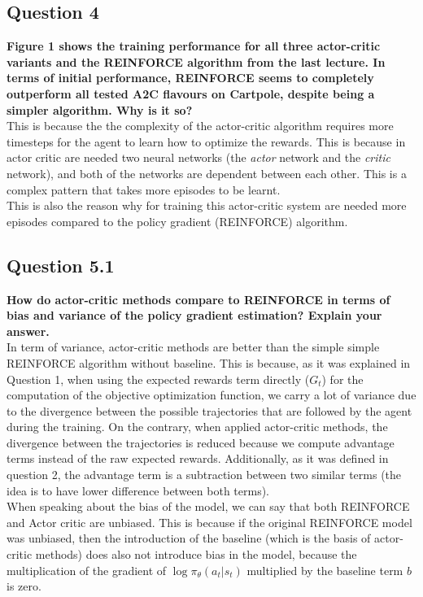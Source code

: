 \documentclass[12pt]{article}
\begin{document}
\subsection{Question 4}
\textbf{Figure 1 shows the training performance for all three actor-critic variants and the REINFORCE algorithm from the last lecture. In terms of initial performance, REINFORCE seems to completely outperform all tested A2C flavours on Cartpole, despite being a simpler algorithm. Why is it so? }\\

This is because the the complexity of the actor-critic algorithm requires more timesteps for the agent to learn how to optimize the rewards. This is because in actor critic are needed two neural networks (the \textit{actor} network and the \textit{critic} network), and both of the networks are dependent between each other. This is a complex pattern that takes more episodes to be learnt.\\

This is also the reason why for training this actor-critic system are needed more episodes compared to the policy gradient (REINFORCE) algorithm.

\subsection{Question 5.1}
\textbf{How do actor-critic methods compare to REINFORCE in terms of bias and variance of the policy gradient estimation? Explain your answer.}\\

In term of variance, actor-critic methods are better than the simple simple REINFORCE algorithm without baseline. This is because, as it was explained in Question 1, when using the expected rewards term directly ($G_t$) for the computation of the objective optimization function, we carry a lot of variance due to the divergence between the possible trajectories that are followed by the agent during the training. On the contrary, when applied actor-critic methods, the divergence between the trajectories is reduced because we compute advantage terms instead of the raw expected rewards. Additionally, as it was defined in question 2, the advantage term is a subtraction between two similar terms (the idea is to have lower difference between both terms). \\

When speaking about the bias of the model, we can say that both REINFORCE and Actor critic are unbiased. This is because if the original REINFORCE model was unbiased, then the introduction of the baseline (which is the basis of actor-critic methods) does also not introduce bias in the model, because the multiplication of the gradient of $\log \pi_\theta(a_t|s_t)$ multiplied by the baseline term $b$ is zero. \\
\end{document}
